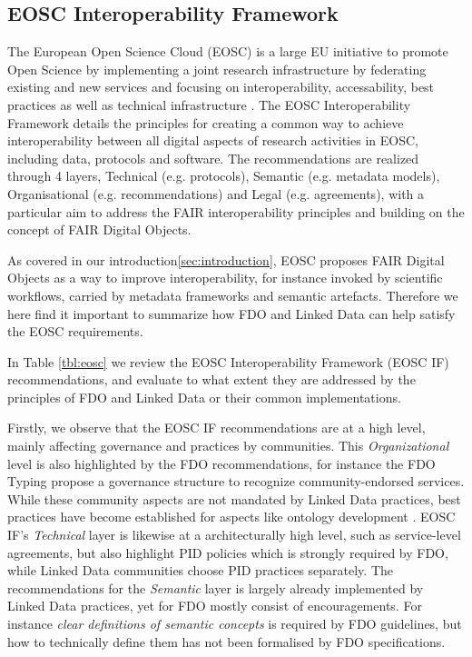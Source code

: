 \documentclass[fleqn,10pt,lineno]{wlpeerjlua}
\begin{document}



\subsection*{EOSC Interoperability Framework}\label{sec:eosc-interoperability-framework}

The European Open Science Cloud (EOSC) is a large EU initiative to promote Open Science by implementing a joint research infrastructure by federating existing and new services and focusing on interoperability, accessability, best practices as well as technical infrastructure \autocite{10.2777/940154}. The EOSC Interoperability Framework \autocite{corchoEOSCInteroperabilityFramework2021b} details the principles for creating a common way to achieve interoperability between all digital aspects of research activities in EOSC, including data, protocols and software. The recommendations are realized through 4 layers, Technical (e.g. protocols), Semantic (e.g. metadata models), Organisational (e.g. recommendations) and Legal (e.g. agreements), with a particular aim to address the FAIR interoperability principles and building on the concept of FAIR Digital Objects. 

As covered in our introduction\vref{sec:introduction}, EOSC proposes FAIR Digital Objects as a way to improve interoperability, for instance invoked by scientific workflows, carried by metadata frameworks and semantic artefacts. Therefore we here find it important to summarize how FDO and Linked Data can help satisfy the EOSC requirements.

In Table \vref{tbl:eosc} we review the EOSC Interoperability Framework (EOSC IF) recommendations, and evaluate to what extent they are addressed by the principles of FDO and Linked Data or their common implementations.

Firstly, we observe that the EOSC IF recommendations are at a high level, mainly affecting governance and practices by communities. This \emph{Organizational} level is also highlighted by the FDO recommendations, for instance the FDO Typing \autocite{fdo-TypingFDOs} propose a governance structure to recognize community-endorsed services. While these community aspects are not mandated by Linked Data practices, best practices have become established for aspects like ontology development \autocite{10.1186/s13326-021-00240-6}. EOSC IF's \emph{Technical} layer is likewise at a architecturally high level, such as service-level agreements, but also highlight PID policies which is strongly required by FDO, while Linked Data communities choose PID practices separately. The recommendations for the \emph{Semantic} layer is largely already implemented by Linked Data practices, yet for FDO mostly consist of encouragements. For instance \emph{clear definitions of semantic concepts} is required by FDO guidelines, but how to technically define them has not been formalised by FDO specifications. 
\end{document}
